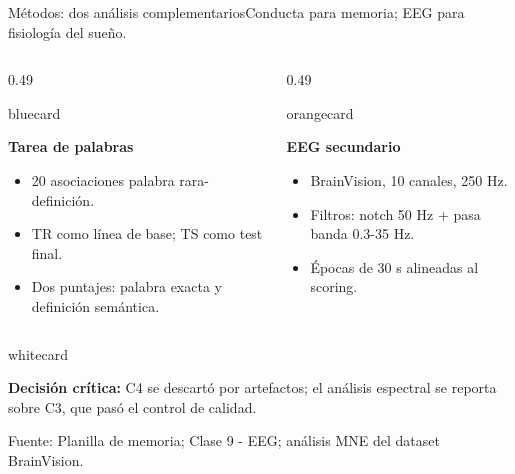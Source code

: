\documentclass[aspectratio=169,10pt]{beamer}
\newcommand{\source}[1]{\vfill {\tiny\color{Muted}Fuente: #1}}
\newenvironment{card}[2][whitecard]{%
  \begin{beamercolorbox}[wd=#2,sep=0.20cm,rounded=true]{#1}\RaggedRight
}{\end{beamercolorbox}}
\begin{document}
\begin{frame}{Métodos: dos análisis complementarios}{Conducta para memoria; EEG para fisiología del sueño.}
\begin{columns}[T,totalwidth=\textwidth]
\begin{column}{0.49\textwidth}
\begin{card}[bluecard]{\linewidth}
\textbf{Tarea de palabras}\par
\begin{itemize}
\item 20 asociaciones palabra rara-definición.
\item TR como línea de base; TS como test final.
\item Dos puntajes: palabra exacta y definición semántica.
\end{itemize}
\end{card}
\end{column}
\begin{column}{0.49\textwidth}
\begin{card}[orangecard]{\linewidth}
\textbf{EEG secundario}\par
\begin{itemize}
\item BrainVision, 10 canales, 250 Hz.
\item Filtros: notch 50 Hz + pasa banda 0.3-35 Hz.
\item Épocas de 30 s alineadas al scoring.
\end{itemize}
\end{card}
\end{column}
\end{columns}
\vspace{0.4cm}
\begin{card}[whitecard]{\textwidth}
\textbf{Decisión crítica:} C4 se descartó por artefactos; el análisis espectral se reporta sobre C3, que pasó el control de calidad.
\end{card}
\source{Planilla de memoria; Clase 9 - EEG; análisis MNE del dataset BrainVision.}
\end{frame}
\end{document}
